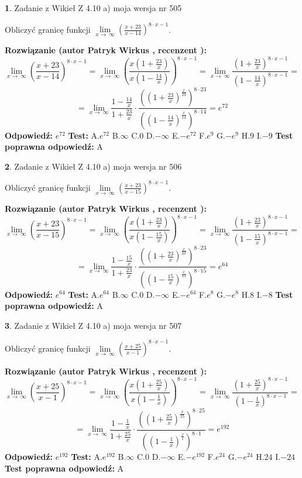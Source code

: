 \documentclass[12pt, a4paper]{article}
\theoremstyle{definition} %
\newtheorem{zad}{}
\newcommand{\zadStart}[1]{\begin{zad}#1\newline}
\newcommand{\zadStop}{\end{zad}}
\newcommand{\rozwStart}[2]{\noindent \textbf{Rozwiązanie (autor #1 , recenzent #2): }\newline}
\newcommand{\rozwStop}{\newline}
\newcommand{\odpStart}{\noindent \textbf{Odpowiedź:}\newline}
\newcommand{\odpStop}{\newline}
\newcommand{\testStart}{\noindent \textbf{Test:}\newline}
\newcommand{\testStop}{\newline}
\newcommand{\kluczStart}{\noindent \textbf{Test poprawna odpowiedź:}\newline}
\newcommand{\kluczStop}{\newline}
\begin{document}
\zadStart{Zadanie z Wikieł Z 4.10 a) moja wersja nr 505}

Obliczyć granicę funkcji  $\lim\limits_{x\to\ \infty}(\frac{x+23}{x-14})^{8\cdot x-1}$.
\zadStop
\rozwStart{Patryk Wirkus}{}
$$\lim\limits_{x\to\ \infty}(\frac{x+23}{x-14})^{8\cdot x-1} = \lim\limits_{x\to\ \infty}(\frac{x(1+\frac{23}{x})}{x(1-\frac{14}{x})})^{8\cdot x-1}=\lim\limits_{x\to\ \infty}\frac{(1+\frac{23}{x})^{8\cdot x-1}}{(1-\frac{14}{x})^{8\cdot x-1}}=$$
$$=\lim\limits_{x\to\ \infty}\frac{1-\frac{14}{x}}{1+\frac{23}{x}}\cdot\frac{((1+\frac{23}{x})^{\frac{x}{23}})^{8\cdot23}}{((1-\frac{14}{x})^{\frac{x}{14}})^{8\cdot14}}=e^{72}$$
\rozwStop
\odpStart
$e^{72}$
\odpStop
\testStart
A.$e^{72}$ B.$\infty$ C.$0$ D.$-\infty$ E.$-e^{72}$
F.$e^{9}$ G.$-e^{9}$
H.$9$
I.$-9$
\testStop
\kluczStart
A
\kluczStop



\zadStart{Zadanie z Wikieł Z 4.10 a) moja wersja nr 506}

Obliczyć granicę funkcji  $\lim\limits_{x\to\ \infty}(\frac{x+23}{x-15})^{8\cdot x-1}$.
\zadStop
\rozwStart{Patryk Wirkus}{}
$$\lim\limits_{x\to\ \infty}(\frac{x+23}{x-15})^{8\cdot x-1} = \lim\limits_{x\to\ \infty}(\frac{x(1+\frac{23}{x})}{x(1-\frac{15}{x})})^{8\cdot x-1}=\lim\limits_{x\to\ \infty}\frac{(1+\frac{23}{x})^{8\cdot x-1}}{(1-\frac{15}{x})^{8\cdot x-1}}=$$
$$=\lim\limits_{x\to\ \infty}\frac{1-\frac{15}{x}}{1+\frac{23}{x}}\cdot\frac{((1+\frac{23}{x})^{\frac{x}{23}})^{8\cdot23}}{((1-\frac{15}{x})^{\frac{x}{15}})^{8\cdot15}}=e^{64}$$
\rozwStop
\odpStart
$e^{64}$
\odpStop
\testStart
A.$e^{64}$ B.$\infty$ C.$0$ D.$-\infty$ E.$-e^{64}$
F.$e^{8}$ G.$-e^{8}$
H.$8$
I.$-8$
\testStop
\kluczStart
A
\kluczStop



\zadStart{Zadanie z Wikieł Z 4.10 a) moja wersja nr 507}

Obliczyć granicę funkcji  $\lim\limits_{x\to\ \infty}(\frac{x+25}{x-1})^{8\cdot x-1}$.
\zadStop
\rozwStart{Patryk Wirkus}{}
$$\lim\limits_{x\to\ \infty}(\frac{x+25}{x-1})^{8\cdot x-1} = \lim\limits_{x\to\ \infty}(\frac{x(1+\frac{25}{x})}{x(1-\frac{1}{x})})^{8\cdot x-1}=\lim\limits_{x\to\ \infty}\frac{(1+\frac{25}{x})^{8\cdot x-1}}{(1-\frac{1}{x})^{8\cdot x-1}}=$$
$$=\lim\limits_{x\to\ \infty}\frac{1-\frac{1}{x}}{1+\frac{25}{x}}\cdot\frac{((1+\frac{25}{x})^{\frac{x}{25}})^{8\cdot25}}{((1-\frac{1}{x})^{\frac{x}{1}})^{8\cdot1}}=e^{192}$$
\rozwStop
\odpStart
$e^{192}$
\odpStop
\testStart
A.$e^{192}$ B.$\infty$ C.$0$ D.$-\infty$ E.$-e^{192}$
F.$e^{24}$ G.$-e^{24}$
H.$24$
I.$-24$
\testStop
\kluczStart
A
\kluczStop
\end{document}

